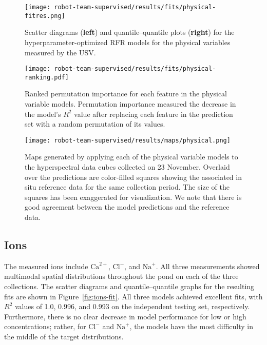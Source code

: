 \newpage

\begin{figure}[H]
  \centering
  \texttt{[image: robot-team-supervised/results/fits/physical-fitres.png]}
  \caption{Scatter diagrams (\textbf{left}) and quantile--quantile plots
    (\textbf{right}) for the hyperparameter-optimized RFR models for the
    physical variables measured by the USV.\label{fig:physical-fit}}
\end{figure}


\begin{figure}[H]
  \centering
  \texttt{[image: robot-team-supervised/results/fits/physical-ranking.pdf]}
  \caption{Ranked permutation importance for each feature in the physical
    variable models. Permutation importance measured the decrease in the model's
    $R^2$ value after replacing each feature in the prediction set with a random
    permutation of its values.\label{fig:physical-fi}}
\end{figure}


\begin{figure}[H]
  \centering
  \texttt{[image: robot-team-supervised/results/maps/physical.png]}
  \caption{Maps generated by applying each of the physical variable models to
    the hyperspectral data cubes collected on 23 November. Overlaid over the
    predictions are color-filled squares showing the associated in situ
    reference data for the same collection period. The size of the squares has
    been exaggerated for visualization. We note that there is good agreement
    between the model predictions and the reference
    data. \label{fig:map-physical}}
\end{figure}


\newpage

\subsection{Ions}

The measured ions include $\mathrm{Ca}^{2+}$, $\mathrm{Cl}^{-}$, and $\mathrm{Na}^{+}$. All three measurements showed multimodal spatial distributions throughout the pond on each of the three collections. The scatter diagrams and quantile--quantile graphs for the resulting fits are shown in Figure~\ref{fig:ions-fit}. All three models achieved excellent fits, with $R^2$ values of 1.0, 0.996, and 0.993 on the independent testing set, respectively. Furthermore, there is no clear decrease in model performance for low or high concentrations; rather, for $\textrm{Cl}^{-}$ and $\textrm{Na}^{+}$, the models have the most difficulty in the middle of the target distributions. 

